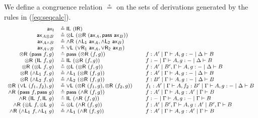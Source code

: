 \documentclass[submission,copyright,creativecommons]{eptcs}
\theoremstyle{definition}
\newcommand{\tl}{\otimes \mathsf{L}}
\newcommand{\tr}{\otimes \mathsf{R}}
\newcommand{\pass}{\mathsf{pass}}
\newcommand{\unitl}{\mathsf{IL}}
\newcommand{\unitr}{\mathsf{IR}}
\newcommand{\andlone}{\land \mathsf{L_{1}}}
\newcommand{\andltwo}{\land \mathsf{L_{2}}}
\newcommand{\andr}{\land \mathsf{R}}
\newcommand{\orl}{\lor \mathsf{L}}
\newcommand{\orrone}{\lor \mathsf{R_{1}}}
\newcommand{\orrtwo}{\lor \mathsf{R_{2}}}
\newcommand{\ax}{\mathsf{ax}}
\newcommand{\ot}{\otimes}
\newcommand{\I}{\mathsf{I}}
\begin{document}
We define a congruence relation $\circeq$ on the sets of derivations generated by the rules in (\ref{eq:seqcalc}). 
\begin{equation}
  \label{fig:circeq}
  \footnotesize
  \begin{array}{rlll}
    \ax_{\I} &\circeq \unitl \text{ } (\unitr)
    \\
    \ax_{A \ot B} &\circeq \tl \text{ } (\tr \text{ } (\ax_{A} , \pass \text{ } \ax_{B}))
    \\
    \ax_{A \land B} &\circeq \andr \ (\andlone \ \ax_A , \andltwo \ \ax_B)
    \\
    \ax_{A \lor B} &\circeq \orl \ (\orrone \ \ax_A , \orrtwo \ \ax_B)
    \\
    \tr \text{ } (\pass \text{ } f, g) &\circeq \pass \text{ } (\tr \text{ } (f, g)) &&f : A' \mid \Gamma \vdash A, g : {-} \mid \Delta \vdash B
    \\
    \tr \text{ } (\unitl \text{ } f, g) &\circeq \unitl \text{ } (\tr \text{ } (f , g)) &&f : {-} \mid \Gamma \vdash A , g : {-} \mid \Delta \vdash B
    \\
    \tr \text{ } (\tl \text{ } f, g) &\circeq \tl \text{ } (\tr \text{ } (f , g)) &&f : A' \mid B' , \Gamma \vdash A , g : {-} \mid \Delta \vdash B
    \\
    \tr \ (\andlone \ f , g) &\circeq \andlone \ (\tr \ (f , g)) &&f : A' \mid \Gamma \vdash A, g : - \mid \Delta \vdash B
    \\
    \tr \ (\andltwo \ f , g) &\circeq \andltwo \ (\tr \ (f , g)) &&f : B' \mid \Gamma \vdash A, g : - \mid \Delta \vdash B
    \\
    \tr \ (\orl \ (f_1 , f_2) , g) &\circeq \orl \ (\tr \ (f_1 , g) , \tr \ (f_2 , g)) &&f_1 : A' \mid \Gamma \vdash A , f_2 : B' \mid \Gamma \vdash A , g : - \mid \Delta \vdash B
    \\
    \andr \ (\pass \ f , \pass \ g) &\circeq \pass \ (\andr \ (f , g)) &&f : A' \mid \Gamma \vdash A , g : A' \mid \Gamma \vdash B
    \\
    \andr \ (\unitl \ f , \unitl \ g) &\circeq \unitl \ (\andr \ (f , g)) &&f : - \mid \Gamma \vdash A , g : - \mid \Gamma \vdash B
    \\
    \andr \ (\tl \ f , \tl \ g) &\circeq \tl \ (\andr \ (f , g)) &&f : A' \mid B' , \Gamma \vdash A , g : A' \mid B' , \Gamma \vdash B
    \\
    \andr \ (\andlone \ f , \andlone \ g) &\circeq \andlone \ (\andr \ (f , g)) &&f : A' \mid \Gamma \vdash A , g : A' \mid \Gamma \vdash B
    \\

\end{array}
\end{equation}
\end{document}
